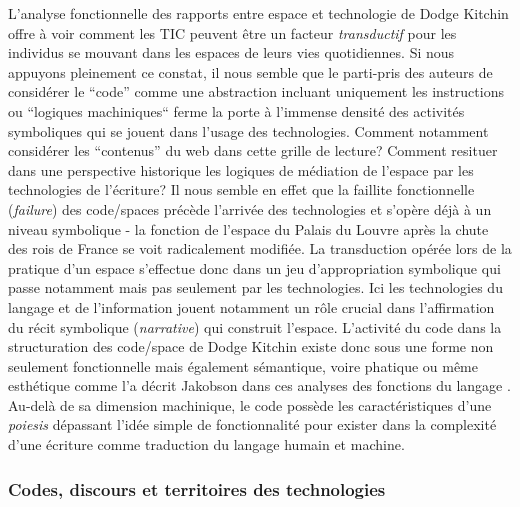 L’analyse fonctionnelle des rapports entre espace et technologie de Dodge  Kitchin offre à voir comment les TIC peuvent être un facteur \textit{transductif} pour les individus se mouvant dans les espaces de leurs vies quotidiennes. Si nous appuyons pleinement ce constat, il nous semble que le parti-pris des auteurs de considérer le “code” comme une abstraction incluant uniquement les instructions ou “logiques machiniques“ ferme la porte à l’immense densité des activités symboliques qui se jouent dans l’usage des technologies. Comment notamment considérer les “contenus” du web dans cette grille de lecture? Comment resituer dans une perspective historique les logiques de médiation de l’espace par les technologies de l’écriture? Il nous semble en effet que la faillite fonctionnelle (\textit{failure}) des code/spaces précède l’arrivée des technologies et s’opère déjà à un niveau symbolique - la fonction de l’espace du Palais du Louvre après la chute des rois de France se voit radicalement modifiée. La transduction opérée lors de la pratique d’un espace s’effectue donc dans un jeu d’appropriation symbolique qui passe notamment mais pas seulement par les technologies. Ici les technologies du langage et de l’information jouent notamment un rôle crucial dans l’affirmation du récit symbolique (\textit{narrative}) qui construit l’espace. L’activité du code dans la structuration des code/space de Dodge  Kitchin existe donc sous une forme non seulement fonctionnelle mais également sémantique, voire phatique ou même esthétique comme l’a décrit Jakobson dans ces analyses des fonctions du langage \citep{Jakobson1956}. Au-delà de sa dimension machinique, le code possède les caractéristiques d’une \textit{poiesis} dépassant l’idée simple de fonctionnalité pour exister dans la complexité d’une écriture comme traduction du langage humain et machine.

\subsubsection[Codes, discours et territoires des technologies]{Codes, discours et territoires des technologies}

